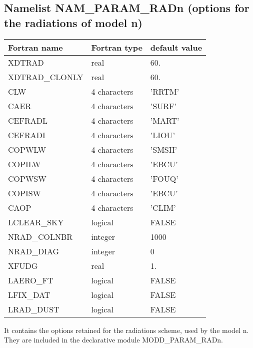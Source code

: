 \subsection{Namelist NAM\_PARAM\_RADn (options for the radiations of model n)}

\begin{longtable} {|p{}|p{}|p{}|}
\hline
Fortran name &  Fortran type & default value \\
\hline 
\endhead
\hline
\endfoot
XDTRAD         &  real          & 60. \\
XDTRAD\_CLONLY &  real          & 60. \\
CLW            &  4 characters  & 'RRTM'   \\
CAER           &  4 characters  & 'SURF'   \\
CEFRADL        &  4 characters  & 'MART'   \\
CEFRADI        &  4 characters  & 'LIOU'   \\
COPWLW         &  4 characters  & 'SMSH'   \\
COPILW         &  4 characters  & 'EBCU'   \\
COPWSW         &  4 characters  & 'FOUQ'   \\
COPISW         &  4 characters  & 'EBCU'   \\
CAOP           &  4 characters  & 'CLIM'   \\
LCLEAR\_SKY    & logical        & FALSE  \\
NRAD\_COLNBR   & integer        & 1000   \\
NRAD\_DIAG     & integer        & 0  \\
XFUDG          & real           &   1.   \\
LAERO\_FT      & logical        & FALSE  \\
LFIX\_DAT      & logical        & FALSE  \\
LRAD\_DUST     & logical        & FALSE  \\
\end{longtable}

It contains the options retained for the radiations scheme, used by the 
model n. They are
included in the declarative module MODD\_PARAM\_RADn.

